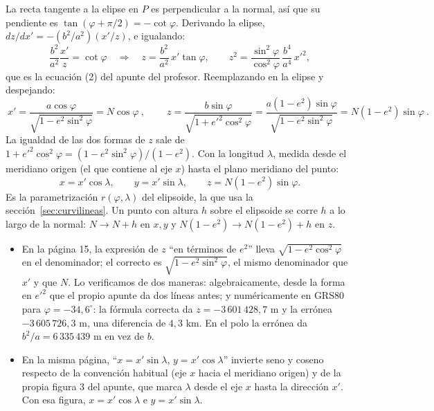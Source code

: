 La recta tangente a la elipse en \(P\) es perpendicular a la normal, así que su pendiente
es \(\tan(\varphi+\pi/2)=-\cot\varphi\). Derivando la elipse,
\(dz/dx'=-(b^2/a^2)(x'/z)\), e igualando:
\[
  \frac{b^2}{a^2}\frac{x'}{z}=\cot\varphi
  \quad\Longrightarrow\quad
  z=\frac{b^2}{a^2}\,x'\tan\varphi,\qquad
  z^2=\frac{\sin^2\varphi}{\cos^2\varphi}\,\frac{b^4}{a^4}\,x'^2 ,
\]
que es la ecuación (2) del apunte del profesor. Reemplazando en la elipse y despejando:
\[
  \boxed{\ x'=\frac{a\cos\varphi}{\sqrt{1-e^2\sin^2\varphi}}=N\cos\varphi\ },\qquad
  \boxed{\ z=\frac{b\sin\varphi}{\sqrt{1+e'^2\cos^2\varphi}}
  =\frac{a(1-e^2)\sin\varphi}{\sqrt{1-e^2\sin^2\varphi}}=N(1-e^2)\sin\varphi\ }.
\]
La igualdad de las dos formas de \(z\) sale de
\(1+e'^2\cos^2\varphi=(1-e^2\sin^2\varphi)/(1-e^2)\). Con la longitud \(\lambda\), medida
desde el meridiano origen (el que contiene al eje \(x\)) hasta el plano meridiano del punto:
\[
  x=x'\cos\lambda,\qquad y=x'\sin\lambda,\qquad z=N(1-e^2)\sin\varphi .
\]
Es la parametrización \(r(\varphi,\lambda)\) del elipsoide, la que usa la
sección~\ref{sec:curvilineas}. Un punto con altura \(h\) sobre el elipsoide se corre \(h\)
a lo largo de la normal: \(N\to N+h\) en \(x,y\) y \(N(1-e^2)\to N(1-e^2)+h\) en \(z\).

\begin{atencion}
\begin{itemize}
  \item En la página 15, la expresión de \(z\) ``en términos de \(e^2\)'' lleva
  \(\sqrt{1-e^2\cos^2\varphi}\) en el denominador; el correcto es
  \(\sqrt{1-e^2\sin^2\varphi}\), el mismo denominador que \(x'\) y que \(N\). Lo verificamos
  de dos maneras: algebraicamente, desde la forma en \(e'^2\) que el propio apunte da dos
  líneas antes; y numéricamente en GRS80 para \(\varphi=-34{,}6^\circ\): la fórmula correcta
  da \(z=-3\,601\,428{,}7\) m y la errónea \(-3\,605\,726{,}3\) m, una diferencia de
  \(4{,}3\) km. En el polo la errónea da \(b^2/a=6\,335\,439\) m en vez de \(b\).
  \item En la misma página, ``\(x=x'\sin\lambda\), \(y=x'\cos\lambda\)'' invierte seno y
  coseno respecto de la convención habitual (eje \(x\) hacia el meridiano origen) y de
  la propia figura 3 del apunte, que marca \(\lambda\) desde el eje \(x\) hasta la
  dirección \(x'\). Con esa figura, \(x=x'\cos\lambda\) e \(y=x'\sin\lambda\).
\end{itemize}
\end{atencion}

